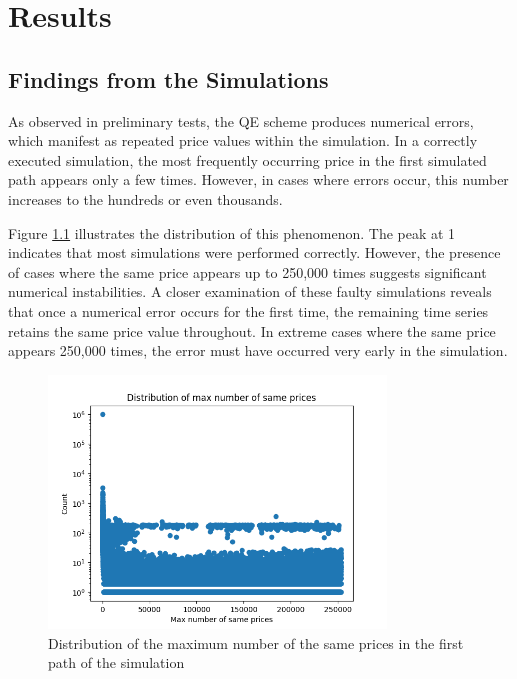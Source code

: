 \chapter{Results}
\label{sec:results}

\section{Findings from the Simulations}
As observed in preliminary tests, the QE scheme produces numerical errors, which manifest as repeated price values within the simulation. In a correctly executed simulation, the most frequently occurring price in the first simulated path appears only a few times. However, in cases where errors occur, this number increases to the hundreds or even thousands.

Figure \ref{fig:max_number_of_same_prices_distribution} illustrates the distribution of this phenomenon. The peak at 1 indicates that most simulations were performed correctly. However, the presence of cases where the same price appears up to 250,000 times suggests significant numerical instabilities. A closer examination of these faulty simulations reveals that once a numerical error occurs for the first time, the remaining time series retains the same price value throughout. In extreme cases where the same price appears 250,000 times, the error must have occurred very early in the simulation.

\begin{figure}
    \centering
    \includegraphics[width=0.8\textwidth]{img/max_number_of_same_prices_distribution.png}
    \caption{Distribution of the maximum number of the same prices in the first path of the simulation}
    \label{fig:max_number_of_same_prices_distribution}
\end{figure}

